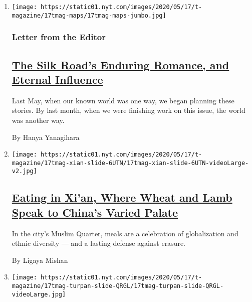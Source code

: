 \begin{enumerate}
\def\labelenumi{\arabic{enumi}.}
\item
  \texttt{[image: https://static01.nyt.com/images/2020/05/17/t-magazine/17tmag-maps/17tmag-maps-jumbo.jpg]}

  \hypertarget{letter-from-the-editor}{%
  \subsubsection{Letter from the Editor}\label{letter-from-the-editor}}

  \hypertarget{the-silk-roads-enduring-romance-and-eternal-influence}{%
  \subsection{\texorpdfstring{\href{/2020/05/11/t-magazine/silk-road-travel-issue.html}{The
  Silk Road's Enduring Romance, and Eternal
  Influence}}{The Silk Road's Enduring Romance, and Eternal Influence}}\label{the-silk-roads-enduring-romance-and-eternal-influence}}

  Last May, when our known world was one way, we began planning these
  stories. By last month, when we were finishing work on this issue, the
  world was another way.

  By Hanya Yanagihara
\item
  \texttt{[image: https://static01.nyt.com/images/2020/05/17/t-magazine/17tmag-xian-slide-6UTN/17tmag-xian-slide-6UTN-videoLarge-v2.jpg]}

  \hypertarget{eating-in-xian-where-wheat-and-lamb-speak-to-chinas-varied-palate}{%
  \subsection{\texorpdfstring{\href{/2020/05/11/t-magazine/xian-china-food.html}{Eating
  in Xi'an, Where Wheat and Lamb Speak to China's Varied
  Palate}}{Eating in Xi'an, Where Wheat and Lamb Speak to China's Varied Palate}}\label{eating-in-xian-where-wheat-and-lamb-speak-to-chinas-varied-palate}}

  In the city's Muslim Quarter, meals are a celebration of globalization
  and ethnic diversity --- and a lasting defense against erasure.

  By Ligaya Mishan
\item
  \texttt{[image: https://static01.nyt.com/images/2020/05/17/t-magazine/17tmag-turpan-slide-QRGL/17tmag-turpan-slide-QRGL-videoLarge.jpg]}


\end{enumerate}
